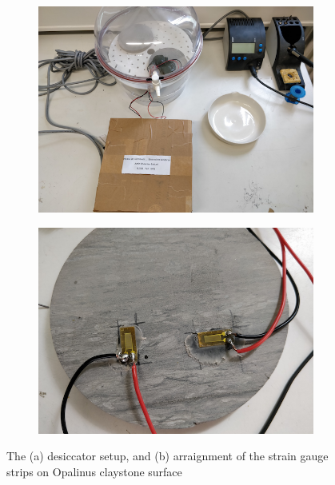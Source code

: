\begin{figure}[!ht]
\begin{subfigure}[c]{0.48\textwidth}
\includegraphics[width=1\textwidth]{figures/Amir_Shrinkage_Full_Setup.png}
\subcaption{}
\label{fig:Amir_Shrinkage_Full_Setup}
\end{subfigure}
\hfill
\begin{subfigure}[c]{0.48\textwidth}
\includegraphics[width=1\textwidth]{figures/Amir_Shrinkage_Sensors.png}
\subcaption{}
\label{fig:Amir_Shrinkage_Sensors}
\end{subfigure}
\caption{The (a) desiccator setup, and (b) arraignment of the strain gauge strips on Opalinus claystone surface}
\end{figure}


